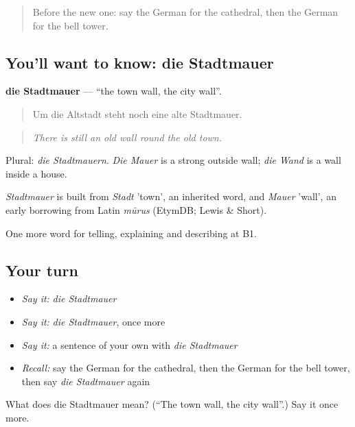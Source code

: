 \begin{quote}
Before the new one: say the German for the cathedral, then the German for the bell tower.
\end{quote}

\subsection*{You'll want to know: die Stadtmauer}
\textbf{die Stadtmauer} — \textquotedblleft{}the town wall, the city wall\textquotedblright{}.

\begin{quote}
Um die Altstadt steht noch eine alte Stadtmauer.
\end{quote}

\begin{quote}
\emph{There is still an old wall round the old town.}
\end{quote}

Plural: \emph{die Stadtmauern}. \emph{Die Mauer} is a strong outside wall; \emph{die Wand} is a wall inside a house.

\begin{cousinweb}
\emph{Stadtmauer} is built from \emph{Stadt} 'town', an inherited word, and \emph{Mauer} 'wall', an early borrowing from Latin \emph{mūrus} (EtymDB; Lewis \& Short).
\end{cousinweb}

\begin{grammarlens}[title={What you've built}]
One more word for telling, explaining and describing at B1.
\end{grammarlens}

\subsection*{Your turn}
\begin{itemize}
\raggedright
  \item \emph{Say it:} \emph{die Stadtmauer}
  \item \emph{Say it:} \emph{die Stadtmauer}, once more
  \item \emph{Say it:} a sentence of your own with \emph{die Stadtmauer}
  \item \emph{Recall:} say the German for the cathedral, then the German for the bell tower, then say \emph{die Stadtmauer} again
\end{itemize}

\begin{tcolorbox}[breakable,colback=teal!4,colframe=teal!35!black,title={Before you move on}]
What does die Stadtmauer mean? (\textquotedblleft{}The town wall, the city wall\textquotedblright{}.) Say it once more.
\end{tcolorbox}

